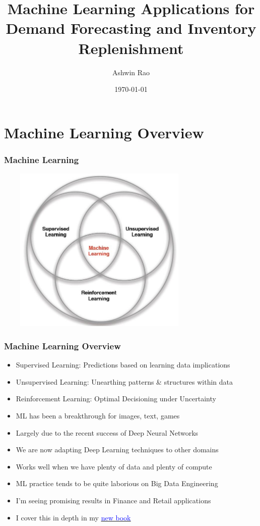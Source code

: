 \documentclass[handout]{beamer}
\title[ML for Forecasting and Replenishment]{Machine Learning Applications for \\ Demand Forecasting and Inventory Replenishment} %
\author{Ashwin Rao} %
\institute[Wayfair/Stanford] %
{
Chief Science Officer @ Wayfair and Adjunct Professor @ Stanford University
}
\date{\today} %
\begin{document}
\begin{frame}
\titlepage %
\end{frame}

\tableofcontents

\section{Machine Learning Overview}

\begin{frame}
\frametitle{Machine Learning}
\includegraphics[width=10cm, height=8cm]{../finance/cme241/MLBranches.PNG}
\end{frame}

\begin{frame}
\frametitle{Machine Learning Overview}
\pause
\begin{itemize}[<+->]
\item Supervised Learning: Predictions based on learning data implications
\item Unsupervised Learning: Unearthing patterns \& structures within data
\item Reinforcement Learning: Optimal Decisioning under Uncertainty
\item ML has been a breakthrough for images, text, games
\item Largely due to the recent success of Deep Neural Networks
\item We are now adapting Deep Learning techniques to other domains
\item Works well when we have plenty of data and plenty of compute
\item ML practice tends to be quite laborious on Big Data Engineering
\item I'm seeing promising results in Finance and Retail applications
\item I cover this in depth in my \href{https://stanford.edu/~ashlearn/RLForFinanceBook/book.pdf}{\underline{\textcolor{blue}{new book}}}
\end{itemize}
\end{frame}
\end{document}
